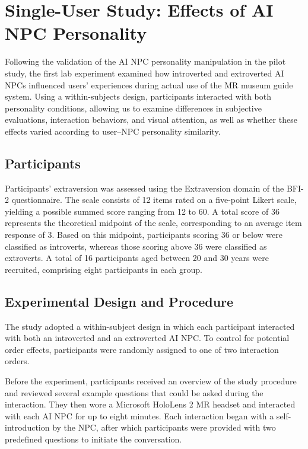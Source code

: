 \documentclass[a4paper,fleqn]{cas-sc}
\begin{document}
\section{Single-User Study: Effects of AI NPC Personality}\label{sec:lab}

Following the validation of the AI NPC personality manipulation in the pilot study, the first lab experiment examined how introverted and extroverted AI NPCs influenced users' experiences during actual use of the MR museum guide system. Using a within-subjects design, participants interacted with both personality conditions, allowing us to examine differences in subjective evaluations, interaction behaviors, and visual attention, as well as whether these effects varied according to user--NPC personality similarity.

\subsection{Participants}

Participants’ extraversion was assessed using the Extraversion domain of the BFI-2 questionnaire. The scale consists of 12 items rated on a five-point Likert scale, yielding a possible summed score ranging from 12 to 60. A total score of 36 represents the theoretical midpoint of the scale, corresponding to an average item response of 3. Based on this midpoint, participants scoring 36 or below were classified as introverts, whereas those scoring above 36 were classified as extroverts. A total of 16 participants aged between 20 and 30 years were recruited, comprising eight participants in each group.

\subsection{Experimental Design and Procedure}

The study adopted a within-subject design in which each participant interacted with both an introverted and an extroverted AI NPC. To control for potential order effects, participants were randomly assigned to one of two interaction orders.

Before the experiment, participants received an overview of the study procedure and reviewed several example questions that could be asked during the interaction. They then wore a Microsoft HoloLens 2 MR headset and interacted with each AI NPC for up to eight minutes. Each interaction began with a self-introduction by the NPC, after which participants were provided with two predefined questions to initiate the conversation.
\end{document}
